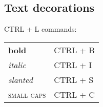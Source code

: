 \documentclass[../main.tex]{subfiles}
\begin{document}
  \subsection{Text decorations}

  CTRL + L commands:

  \begin{table}[htb]
    \begin{tabular}{ll} 
    \textbf{bold}       & CTRL + B  \\
    \textit{italic}     & CTRL + I  \\
    \textsl{slanted}    & CTRL + S  \\
    \textsc{small caps} & CTRL + C  \\
    \end{tabular}
    \end{table}
\end{document}
